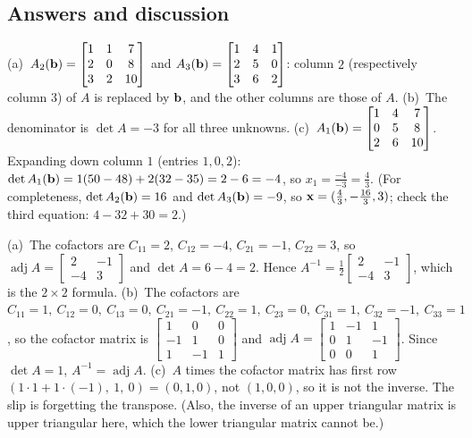 \documentclass[11pt]{article}
\begin{document}
\subsection*{Answers and discussion}
\begin{description}[leftmargin=0pt,itemsep=5pt]
  \item[Knowledge Check \ref{kc:replace}.] (a)~$A_2(\mathbf{b})=\begin{bmatrix}1&1&7\\2&0&8\\3&2&10\end{bmatrix}$ and $A_3(\mathbf{b})=\begin{bmatrix}1&4&1\\2&5&0\\3&6&2\end{bmatrix}$: column $2$ (respectively column $3$) of $A$ is replaced by $\mathbf{b}$, and the other columns are those of $A$. (b)~The denominator is $\det A=-3$ for all three unknowns. (c)~$A_1(\mathbf{b})=\begin{bmatrix}1&4&7\\0&5&8\\2&6&10\end{bmatrix}$. Expanding down column $1$ (entries $1,0,2$): $\det A_1(\mathbf{b})=1(50-48)+2(32-35)=2-6=-4$, so $x_1=\frac{-4}{-3}=\frac43$. (For completeness, $\det A_2(\mathbf{b})=16$ and $\det A_3(\mathbf{b})=-9$, so $\mathbf{x}=(\tfrac43,-\tfrac{16}3,3)$; check the third equation: $4-32+30=2$.)
  \item[Knowledge Check \ref{kc:adj}.] (a)~The cofactors are $C_{11}=2$, $C_{12}=-4$, $C_{21}=-1$, $C_{22}=3$, so $\operatorname{adj}A=\begin{bmatrix}2&-1\\-4&3\end{bmatrix}$ and $\det A=6-4=2$. Hence $A^{-1}=\frac12\begin{bmatrix}2&-1\\-4&3\end{bmatrix}$, which is the $2\times2$ formula. (b)~The cofactors are $C_{11}=1,\ C_{12}=0,\ C_{13}=0,\ C_{21}=-1,\ C_{22}=1,\ C_{23}=0,\ C_{31}=1,\ C_{32}=-1,\ C_{33}=1$, so the cofactor matrix is $\begin{bmatrix}1&0&0\\-1&1&0\\1&-1&1\end{bmatrix}$ and $\operatorname{adj}A=\begin{bmatrix}1&-1&1\\0&1&-1\\0&0&1\end{bmatrix}$. Since $\det A=1$, $A^{-1}=\operatorname{adj}A$. (c)~$A$ times the cofactor matrix has first row $(1\cdot1+1\cdot(-1),\ 1,\ 0)=(0,1,0)$, not $(1,0,0)$, so it is not the inverse. The slip is forgetting the transpose. (Also, the inverse of an upper triangular matrix is upper triangular here, which the lower triangular matrix cannot be.)

\end{description}
\end{document}
